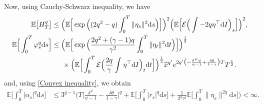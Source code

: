 \documentclass[12,reqno]{amsart}
\numberwithin{equation}{section}
\begin{document}
Now, using Cauchy-Schwarz inequality, we have 
\begin{align}
	\mathbb{E}\big[H_{T}^{q}\big]&\le\Big(\mathbb{E}\Big[\exp\Big((2q^{2}-q)\int_{0}^{T}\|\eta_{s}\|^{2}\mathrm{d}s\Big)\Big]\Big)^{2}\Big(\mathbb{E}\Big[\mathcal{E}\Big(\int-2q\eta^{\top}\mathrm{d}I\Big)_{s}\Big]\Big)^{2},\label{Integrability of HT_power}\\
	\mathbb{E}\Big[\int_{0}^{T}\varphi_{s}^{q}\mathrm{d}s\Big]&\le\Big(\mathbb{E}\Big[\exp\Big(\frac{2q^{2}+(\gamma-1)q}{\gamma^{2}}\int_{0}^{T}\|\eta_{t}\|^{2}\mathrm{d}t\Big)\Big]\Big)^{\frac{1}{2}}\notag\\
	&\phantom{Xx}\times\Big(\mathbb{E}\Big[\int_{0}^{T}\mathcal{E}\Big(\frac{2q}{\gamma}\int_{}^{}\eta^{\top}\mathrm{d}I\Big)_{t}\mathrm{d}t\Big]\Big)^{\frac{1}{2}}\widetilde{x}^{q'}e^{2q'\big(-\frac{\delta^{\psi}\psi}{\psi-1}+\frac{\delta\theta}{1-\gamma}\big)T}T^{\frac{1}{2}}.\label{Integrability of varphi_power}
\end{align}
and, using \eqref{Convex inequality}, we obtain
\begin{align}\label{Integrability of alpha_power}
	\mathbb{E}\Big[\int_{0}^{T}|\alpha_{s}|^{q}\mathrm{d}s\Big]&\le3^{q-1}\Big(T\Big|\frac{\delta^{\psi}}{\psi-1}-\frac{\delta\theta}{1-\gamma}\Big|^{q}+\mathbb{E}\Big[\int_{0}^{T}|r_{s}|^{q}\mathrm{d}s\Big]+\frac{1}{2^{q}\gamma^{q}}\mathbb{E}\Big[\int_{0}^{T}\|\eta_{s}\|^{2q}\mathrm{d}s\Big]\Big)<\infty.
\end{align}
\end{document}
